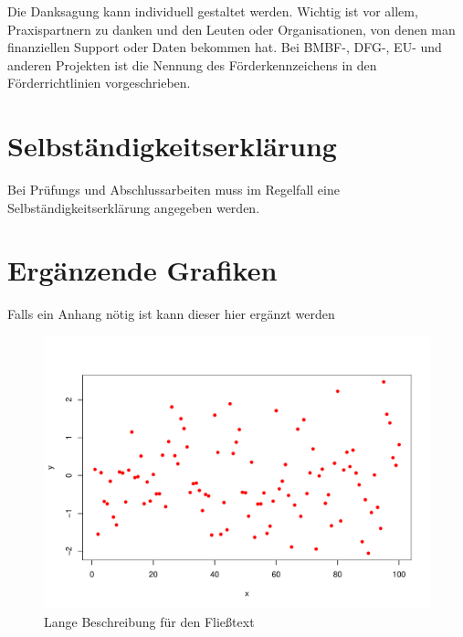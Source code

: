 \documentclass[ngerman,11pt,a4paper]{article}
\begin{document}
Die Danksagung kann individuell gestaltet werden. Wichtig ist vor allem,
Praxispartnern zu danken und den Leuten oder Organisationen, von denen man
finanziellen Support oder Daten bekommen hat. Bei BMBF-, DFG-, EU- und anderen
Projekten ist die Nennung des Förderkennzeichens in den Förderrichtlinien
vorgeschrieben.

\section*{Selbständigkeitserklärung}

Bei Prüfungs und Abschlussarbeiten muss im Regelfall eine Selbständigkeitserklärung angegeben werden.



\printbibliography



\setcounter{section}{0}
\renewcommand\thesection{\Alph{section}}
\section{Ergänzende Grafiken}

Falls ein Anhang nötig ist kann dieser hier ergänzt werden

\begin{figure}[h]
	\includegraphics[width=\linewidth]{pdf-plot.pdf}
	\caption[kurze Beschreibung für die Liste der Abbildungen]{Lange Beschreibung für den Fließtext}
\end{figure}
\end{document}
